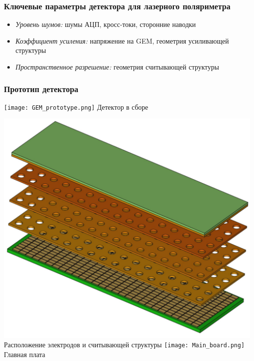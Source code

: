 \documentclass[14pt]{beamer}
\begin{document}
\begin{frame}[t]
\frametitle{Ключевые параметры детектора для лазерного поляриметра}
		\begin{itemize}
				\item \textit{Уровень шумов:} шумы АЦП, кросс-токи, сторонние наводки
				\item  \textit{Коэффициент усиления:} напряжение на GEM, геометрия усиливающей структуры
				\item  \textit{Пространственное разрешение:} геометрия считывающей структуры 
		\end{itemize}
\end{frame}


\begin{frame}[t]
\frametitle{Прототип детектора}
		\begin{minipage}[c]{0.59\linewidth}
			\centering
			\texttt{[image: GEM\_prototype.png]} 
			\newline \tiny{Детектор в сборе}
		\end{minipage}
		\begin{minipage}[t]{0.39\linewidth}
		\includegraphics[width=1\linewidth, height = 0.4\textheight]{GEM_model.pdf}
		\tiny{Расположение электродов и считывающей структуры}
		\texttt{[image: Main\_board.png]} 
		\newline \centering\tiny{Главная плата}
		\end{minipage}	
\end{frame}
\end{document}

